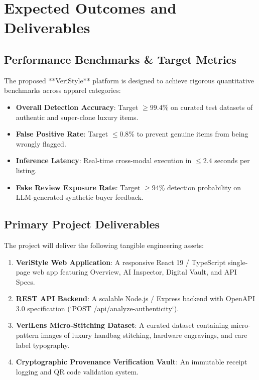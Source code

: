 \documentclass[a4paper,12pt]{report}
\begin{document}
\newpage

\chapter{Expected Outcomes and Deliverables}

\section{Performance Benchmarks \& Target Metrics}
The proposed **VeriStyle** platform is designed to achieve rigorous quantitative benchmarks across apparel categories:
\begin{itemize}
    \item \textbf{Overall Detection Accuracy}: Target $\ge 99.4\%$ on curated test datasets of authentic and super-clone luxury items.
    \item \textbf{False Positive Rate}: Target $\le 0.8\%$ to prevent genuine items from being wrongly flagged.
    \item \textbf{Inference Latency}: Real-time cross-modal execution in $\le 2.4$ seconds per listing.
    \item \textbf{Fake Review Exposure Rate}: Target $\ge 94\%$ detection probability on LLM-generated synthetic buyer feedback.
\end{itemize}

\section{Primary Project Deliverables}
The project will deliver the following tangible engineering assets:
\begin{enumerate}
    \item \textbf{VeriStyle Web Application}: A responsive React 19 / TypeScript single-page web app featuring Overview, AI Inspector, Digital Vault, and API Specs.
    \item \textbf{REST API Backend}: A scalable Node.js / Express backend with OpenAPI 3.0 specification (`POST /api/analyze-authenticity`).
    \item \textbf{VeriLens Micro-Stitching Dataset}: A curated dataset containing micro-pattern images of luxury handbag stitching, hardware engravings, and care label typography.
    \item \textbf{Cryptographic Provenance Verification Vault}: An immutable receipt logging and QR code validation system.
\end{enumerate}
\end{document}
